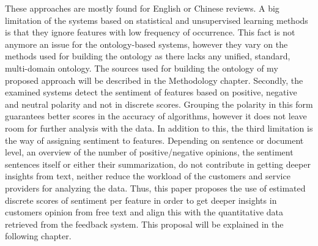  These approaches are mostly found for English or Chinese reviews. A big limitation of the systems based on statistical and unsupervised learning methods is that they ignore features with low frequency of occurrence. This fact is not anymore an issue for the ontology-based systems, however they vary on the methods used for building the ontology as there lacks any unified, standard, multi-domain ontology. The sources used for building the ontology of my proposed approach will be described in the Methodology chapter.
Secondly, the examined systems detect the sentiment of features based on positive, negative and neutral polarity and not in discrete scores. Grouping the polarity in this form guarantees better scores in the accuracy of algorithms, however it does not leave room for further analysis with the data.
In addition to this, the third limitation is the way of assigning sentiment to features. Depending on sentence or document level, an overview of the number of positive/negative opinions, the sentiment sentences itself or either their summarization, do not contribute in getting deeper insights from text, neither reduce the workload of the customers and service providers for analyzing the data.
Thus, this paper proposes the use of estimated discrete scores of sentiment per feature in order to get deeper insights in customers opinion from free text and align this with the quantitative data retrieved from the feedback system. This proposal will be explained in the following chapter.
